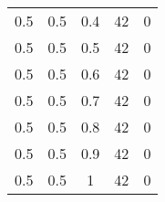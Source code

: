\begin{table}
\begin{minipage}[ht!]{0.50\hsize}
\begin{center}
{\begin{tabular}{|c|c|c|c|c|}
					0.5  & 0.5  & 0.4  & 42  & 0     \\
					0.5  & 0.5  & 0.5  & 42  & 0     \\
					0.5  & 0.5  & 0.6  & 42  & 0     \\
					0.5  & 0.5  & 0.7  & 42  & 0     \\
					0.5  & 0.5  & 0.8  & 42  & 0     \\
					0.5  & 0.5  & 0.9  & 42  & 0     \\
					0.5  & 0.5  & 1    & 42  & 0     \\ \hline
					
					\hline
			\end{tabular}}			
		\end{center}
	\end{minipage}
\end{table}

